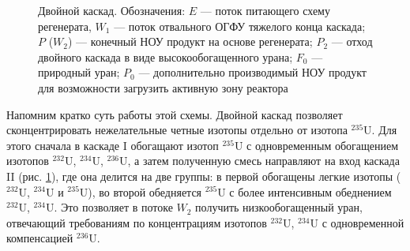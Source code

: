 \begin{figure}[ht]
  \caption{Двойной каскад. Обозначения: $E$ --- поток питающего схему регенерата, $W_1$ --- поток отвального ОГФУ тяжелого конца каскада; $P$ ($W_2$) --- конечный НОУ продукт на основе регенерата; $P_2$ --- отход двойного каскада в виде высокообогащенного урана; $F_0$ --- природный уран; $P_0$ --- дополнительно производимый НОУ продукт для возможности загрузить активную зону реактора}\label{fig:double_ru_in3}
\end{figure}

Напомним кратко суть работы этой схемы. Двойной каскад позволяет сконцентрировать нежелательные четные изотопы отдельно от изотопа $^{235}$U. Для этого сначала в каскаде I обогащают изотоп $^{235}$U с одновременным обогащением изотопов $^{232}$U, $^{234}$U, $^{236}$U, а затем полученную смесь направляют на вход каскада II (рис. \ref{fig:double_ru_in3}), где она делится на две группы: в первой обогащены легкие изотопы ($^{232}$U, $^{234}$U и $^{235}$U), во второй обедняется $^{235}$U с более интенсивным обеднением $^{232}$U, $^{234}$U. Это позволяет в потоке $W_2$ получить низкообогащенный уран, отвечающий требованиям по концентрациям изотопов $^{232}$U, $^{234}$U с одновременной компенсацией $^{236}$U.

